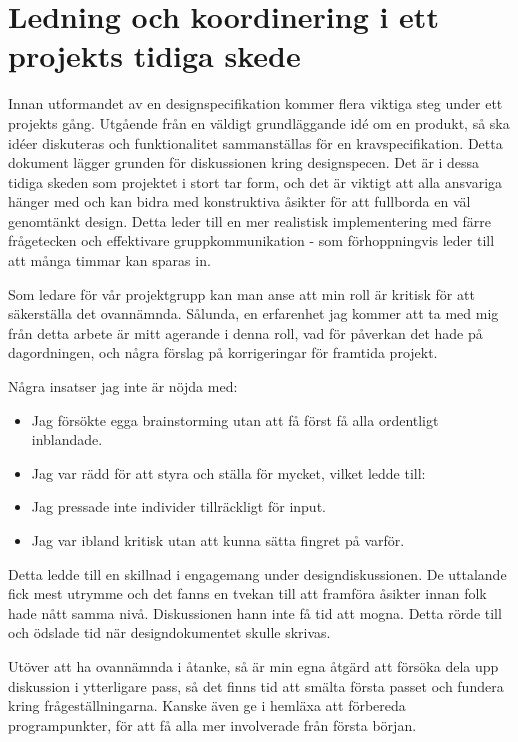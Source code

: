 \section{Ledning och koordinering i ett projekts tidiga skede}

Innan utformandet av en designspecifikation kommer flera viktiga steg under ett projekts gång. Utgående från en väldigt grundläggande idé om en produkt, så ska idéer diskuteras och funktionalitet sammanställas för en kravspecifikation. Detta dokument lägger grunden för diskussionen kring designspecen. Det är i dessa tidiga skeden som projektet i stort tar form, och det är viktigt att alla ansvariga hänger med och kan bidra med konstruktiva åsikter för att fullborda en väl genomtänkt design. Detta leder till en mer realistisk implementering med färre frågetecken och effektivare gruppkommunikation - som förhoppningvis leder till att många timmar kan sparas in.

Som ledare för vår projektgrupp kan man anse att min roll är kritisk för att säkerställa det ovannämnda. Sålunda, en erfarenhet jag kommer att ta med mig från detta arbete är mitt agerande i denna roll, vad för påverkan det hade på dagordningen, och några förslag på korrigeringar för framtida projekt.

Några insatser jag inte är nöjda med:
\begin{itemize}
\item Jag försökte egga brainstorming utan att få först få alla ordentligt inblandade.
\item Jag var rädd för att styra och ställa för mycket, vilket ledde till:
\item Jag pressade inte individer tillräckligt för input.
\item Jag var ibland kritisk utan att kunna sätta fingret på varför.
\end{itemize}
Detta ledde till en skillnad i engagemang under designdiskussionen. De uttalande fick mest utrymme
och det fanns en tvekan till att framföra åsikter innan folk hade nått samma nivå.
Diskussionen hann inte få tid att mogna. Detta rörde till och ödslade tid när
designdokumentet skulle skrivas.

Utöver att ha ovannämnda i åtanke, så är min egna åtgärd att försöka dela upp diskussion i ytterligare pass,
så det finns tid att smälta första passet och fundera kring frågeställningarna. Kanske även ge i hemläxa
att förbereda programpunkter, för att få alla mer involverade från första början.
